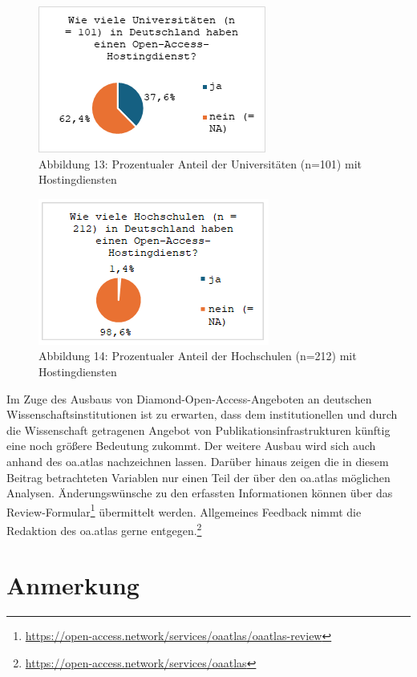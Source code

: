 \documentclass[a4paper,
fontsize=11pt,
oneside,
numbers=noperiodatend,
parskip=half-,
bibliography=totoc,
final
]{scrartcl}
\begin{document}
\begin{figure}[H]
\centering
\includegraphics[]{img/image014.png}
\caption{Abbildung 13: Prozentualer Anteil der Universitäten (n=101) mit Hostingdiensten}
\end{figure}

\begin{figure}[H]
\centering
\includegraphics[]{img/image013.png}
\caption{Abbildung 14: Prozentualer Anteil der Hochschulen (n=212) mit Hostingdiensten}
\end{figure}

Im Zuge des Ausbaus von Diamond-Open-Access-Angeboten an deutschen
Wissenschaftsinstitutionen ist zu erwarten, dass dem institutionellen
und durch die Wissenschaft getragenen Angebot von
Publikationsinfrastrukturen künftig eine noch größere Bedeutung zukommt.
Der weitere Ausbau wird sich auch anhand des oa.atlas nachzeichnen
lassen. Darüber hinaus zeigen die in diesem Beitrag betrachteten
Variablen nur einen Teil der über den oa.atlas möglichen Analysen.
Änderungswünsche zu den erfassten Informationen können über das
Review-Formular\footnote{\url{https://open-access.network/services/oaatlas/oaatlas-review}}
übermittelt werden. Allgemeines Feedback nimmt die Redaktion des
oa.atlas gerne entgegen.\footnote{\url{https://open-access.network/services/oaatlas}}

\section{Anmerkung}\label{anmerkung}
\end{document}
